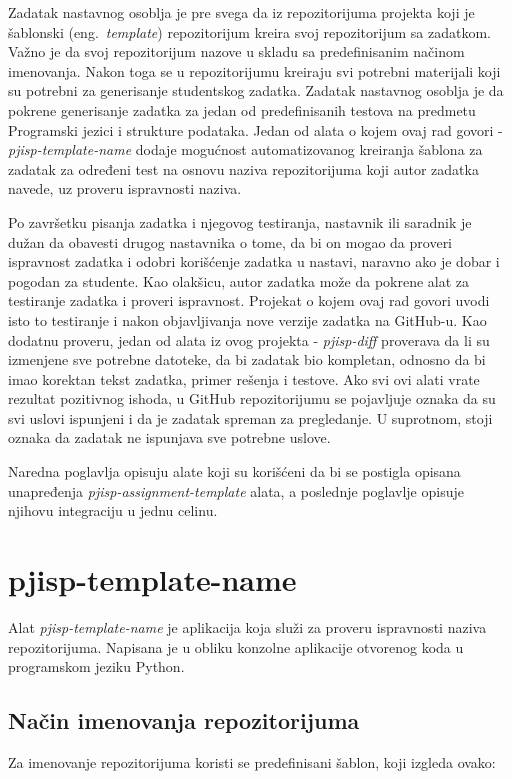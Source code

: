 \documentclass[12pt]{report}
\begin{document}
Zadatak nastavnog osoblja je pre svega da iz repozitorijuma projekta koji je šablonski (eng.\ \textit{template}) repozitorijum kreira svoj repozitorijum sa zadatkom. Važno je da svoj repozitorijum nazove u skladu sa predefinisanim načinom imenovanja. Nakon toga se u repozitorijumu kreiraju svi potrebni materijali koji su potrebni za generisanje studentskog zadatka. Zadatak nastavnog osoblja je da pokrene generisanje zadatka za jedan od predefinisanih testova na predmetu Programski jezici i strukture podataka. Jedan od alata o kojem ovaj rad govori - \textit{pjisp-template-name} dodaje mogućnost automatizovanog kreiranja šablona za zadatak za određeni test na osnovu naziva repozitorijuma koji autor zadatka navede, uz proveru ispravnosti naziva.

Po završetku pisanja zadatka i njegovog testiranja, nastavnik ili saradnik je dužan da obavesti drugog nastavnika o tome, da bi on mogao da proveri ispravnost zadatka i odobri korišćenje zadatka u nastavi, naravno ako je dobar i pogodan za studente. Kao olakšicu, autor zadatka može da pokrene alat za testiranje zadatka i proveri ispravnost. Projekat o kojem ovaj rad govori uvodi isto to testiranje i nakon objavljivanja nove verzije zadatka na GitHub-u. Kao dodatnu proveru, jedan od alata iz ovog projekta - \textit{pjisp-diff} proverava da li su izmenjene sve potrebne datoteke, da bi zadatak bio kompletan, odnosno da bi imao korektan tekst zadatka, primer rešenja i testove. Ako svi ovi alati vrate rezultat pozitivnog ishoda, u GitHub repozitorijumu se pojavljuje oznaka da su svi uslovi ispunjeni i da je zadatak spreman za pregledanje. U suprotnom, stoji oznaka da zadatak ne ispunjava sve potrebne uslove.

Naredna poglavlja opisuju alate koji su korišćeni da bi se postigla opisana unapređenja \textit{pjisp-assignment-template} alata, a poslednje poglavlje opisuje njihovu integraciju u jednu celinu.

\section{pjisp-template-name}
Alat \textit{pjisp-template-name} \cite{pjisp-template-name} je aplikacija koja služi za proveru ispravnosti naziva repozitorijuma. Napisana je u obliku konzolne aplikacije otvorenog koda u programskom jeziku Python.

\subsection{Način imenovanja repozitorijuma}
Za imenovanje repozitorijuma koristi se predefinisani šablon, koji izgleda ovako:
\end{document}
